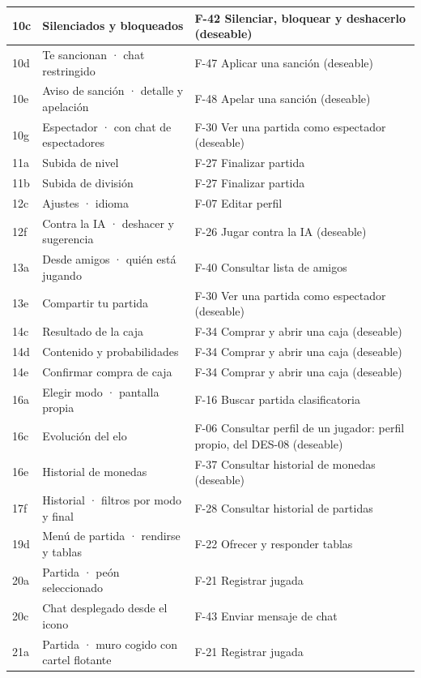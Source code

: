 \begin{center}
\begin{longtable}{|L{0.115\textwidth}|L{0.40\textwidth}|L{0.385\textwidth}|}
10c & Silenciados y bloqueados & \mbox{F-42} Silenciar, bloquear y deshacerlo (deseable) \\ \hline
10d & Te sancionan · chat restringido & \mbox{F-47} Aplicar una sanción (deseable) \\ \hline
10e & Aviso de sanción · detalle y apelación & \mbox{F-48} Apelar una sanción (deseable) \\ \hline
10g & Espectador · con chat de espectadores & \mbox{F-30} Ver una partida como espectador (deseable) \\ \hline
11a & Subida de nivel & \mbox{F-27} Finalizar partida \\ \hline
11b & Subida de división & \mbox{F-27} Finalizar partida \\ \hline
12c & Ajustes · idioma & \mbox{F-07} Editar perfil \\ \hline
12f & Contra la IA · deshacer y sugerencia & \mbox{F-26} Jugar contra la IA (deseable) \\ \hline
13a & Desde amigos · quién está jugando & \mbox{F-40} Consultar lista de amigos \\ \hline
13e & Compartir tu partida & \mbox{F-30} Ver una partida como espectador (deseable) \\ \hline
14c & Resultado de la caja & \mbox{F-34} Comprar y abrir una caja (deseable) \\ \hline
14d & Contenido y probabilidades & \mbox{F-34} Comprar y abrir una caja (deseable) \\ \hline
14e & Confirmar compra de caja & \mbox{F-34} Comprar y abrir una caja (deseable) \\ \hline
16a & Elegir modo · pantalla propia & \mbox{F-16} Buscar partida clasificatoria \\ \hline
16c & Evolución del elo & \mbox{F-06} Consultar perfil de un jugador: perfil propio, del \mbox{DES-08} (deseable) \\ \hline
16e & Historial de monedas & \mbox{F-37} Consultar historial de monedas (deseable) \\ \hline
17f & Historial · filtros por modo y final & \mbox{F-28} Consultar historial de partidas \\ \hline
19d & Menú de partida · rendirse y tablas & \mbox{F-22} Ofrecer y responder tablas \\ \hline
20a & Partida · peón seleccionado & \mbox{F-21} Registrar jugada \\ \hline
20c & Chat desplegado desde el icono & \mbox{F-43} Enviar mensaje de chat \\ \hline
21a & Partida · muro cogido con cartel flotante & \mbox{F-21} Registrar jugada \\ \hline
\end{longtable}
\end{center}

